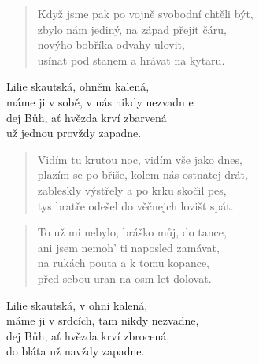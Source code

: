 \begin{song}{}
\begin{verse}
  Když jsme pak po vojně svobodní chtěli být, \\
   zbylo nám jediný, na západ přejít čáru, \\
   novýho bobříka odvahy ulovit,  \\
   usínat pod stanem a hrávat na kytaru.
\end{verse}
\begin{refren}
   Lilie skautská, ohněm kalená, \\
   máme ji v sobě, v nás nikdy nezvadn e \\
   dej Bůh, ať hvězda krví zbarvená \\
   už jednou provždy zapadne.
\end{refren}
\begin{verse}
   Vidím tu krutou noc, vidím vše jako dnes, \\
   plazím se po břiše, kolem nás ostnatej drát, \\
   zableskly výstřely a po krku skočil pes, \\
   tys bratře odešel do věčnejch lovišť spát.
\end{verse}
  \begin{verse}
   To už mi nebylo, bráško můj, do tance,  \\
   ani jsem nemoh' ti naposled zamávat, \\
   na rukách pouta a k tomu kopance,  \\
   před sebou uran na osm let dolovat.
\end{verse}
\begin{refren}
   Lilie skautská, v ohni kalená, \\ máme ji v srdcích, tam nikdy nezvadne, \\
   dej Bůh, ať hvězda krví zbrocená, \\ do bláta už navždy zapadne.
\end{refren}
\end{song}
\pagebreak
